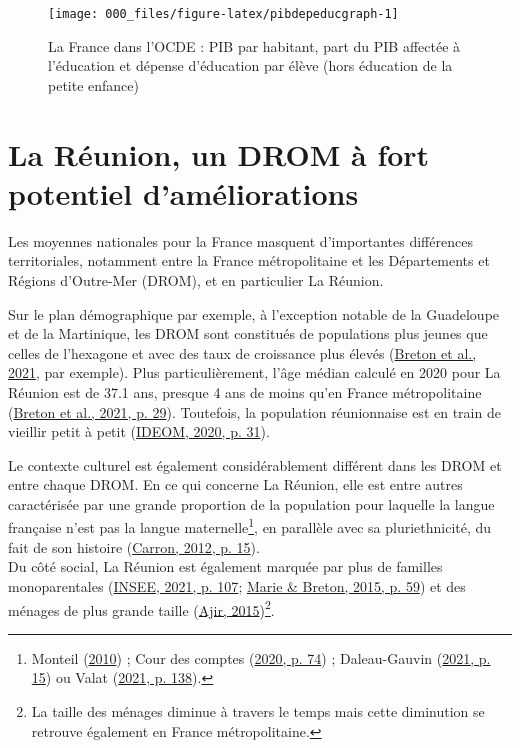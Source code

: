 \documentclass[
]{book}
\begin{document}
\begin{figure}[H]

{\centering \texttt{[image: 000\_files/figure-latex/pibdepeducgraph-1]} 

}

\caption{La France dans l'OCDE : PIB par habitant, part du PIB affectée à l'éducation et dépense d'éducation par élève (hors éducation de la petite enfance)}\label{fig:pibdepeducgraph}
\end{figure}

\hypertarget{la-ruxe9union-un-drom-uxe0-fort-potentiel-damuxe9liorations}{%
\section*{La Réunion, un DROM à fort potentiel d'améliorations}\label{la-ruxe9union-un-drom-uxe0-fort-potentiel-damuxe9liorations}}

Les moyennes nationales pour la France masquent d'importantes différences territoriales, notamment entre la France métropolitaine et les Départements et Régions d'Outre-Mer (DROM), et en particulier La Réunion.

Sur le plan démographique par exemple, à l'exception notable de la Guadeloupe et de la Martinique, les DROM sont constitués de populations plus jeunes que celles de l'hexagone et avec des taux de croissance plus élevés (\protect\hyperlink{ref-BRE:eal:21}{Breton et al., 2021}, par exemple). Plus particulièrement, l'âge médian calculé en 2020 pour La Réunion est de 37.1 ans, presque 4 ans de moins qu'en France métropolitaine (\protect\hyperlink{ref-BRE:eal:21}{Breton et al., 2021, p. 29}). Toutefois, la population réunionnaise est en train de vieillir petit à petit (\protect\hyperlink{ref-IDE:20}{IDEOM, 2020, p. 31}).

Le contexte culturel est également considérablement différent dans les DROM et entre chaque DROM. En ce qui concerne La Réunion, elle est entre autres caractérisée par une grande proportion de la population pour laquelle la langue française n'est pas la langue maternelle\footnote{Monteil (\protect\hyperlink{ref-MON:10}{2010}) ; Cour des comptes (\protect\hyperlink{ref-COU:20}{2020, p. 74}) ; Daleau-Gauvin (\protect\hyperlink{ref-DAL:21}{2021, p. 15}) ou Valat (\protect\hyperlink{ref-VAL:21}{2021, p. 138}).}, en parallèle avec sa pluriethnicité, du fait de son histoire (\protect\hyperlink{ref-CAR:12}{Carron, 2012, p. 15}).\\
Du côté social, La Réunion est également marquée par plus de familles monoparentales (\protect\hyperlink{ref-INS:21}{INSEE, 2021, p. 107}; \protect\hyperlink{ref-MAR:BRE:15}{Marie \& Breton, 2015, p. 59}) et des ménages de plus grande taille (\protect\hyperlink{ref-AJI:15}{Ajir, 2015})\footnote{La taille des ménages diminue à travers le temps mais cette diminution se retrouve également en France métropolitaine.}.
\end{document}
